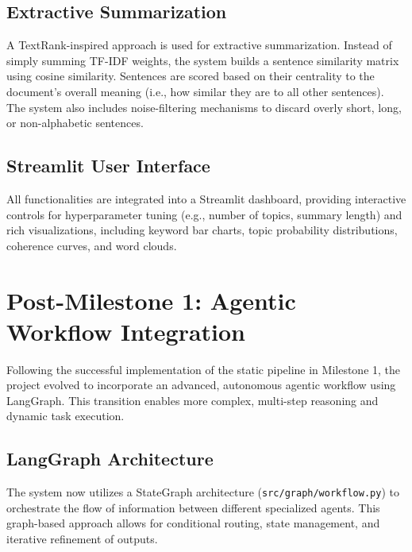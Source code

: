\documentclass[12pt, a4paper]{article}
\begin{document}
\subsection{Extractive Summarization}
A TextRank-inspired approach is used for extractive summarization. Instead of simply summing TF-IDF weights, the system builds a sentence similarity matrix using cosine similarity. Sentences are scored based on their centrality to the document's overall meaning (i.e., how similar they are to all other sentences). The system also includes noise-filtering mechanisms to discard overly short, long, or non-alphabetic sentences.

\subsection{Streamlit User Interface}
All functionalities are integrated into a Streamlit dashboard, providing interactive controls for hyperparameter tuning (e.g., number of topics, summary length) and rich visualizations, including keyword bar charts, topic probability distributions, coherence curves, and word clouds.

\section{Post-Milestone 1: Agentic Workflow Integration}
Following the successful implementation of the static pipeline in Milestone 1, the project evolved to incorporate an advanced, autonomous agentic workflow using LangGraph. This transition enables more complex, multi-step reasoning and dynamic task execution.

\subsection{LangGraph Architecture}
The system now utilizes a StateGraph architecture (\texttt{src/graph/workflow.py}) to orchestrate the flow of information between different specialized agents. This graph-based approach allows for conditional routing, state management, and iterative refinement of outputs.
\end{document}
